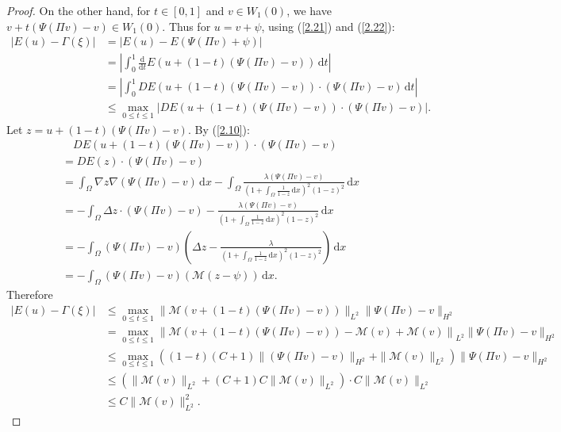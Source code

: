 \documentclass{article}
\numberwithin{equation}{section}
\begin{document}
\begin{proof}
    On the other hand, for $t\in [0,1]$ and $v\in W_1(0)$, we have $v+t(\Psi(\Pi v)-v)\in W_1(0)$. Thus for $u=v+\psi$, using (\ref{2.21}) and (\ref{2.22}):
    \begin{align*}
        |E(u)-\Gamma(\xi)|&=|E(u)-E(\Psi(\Pi v)+\psi)|\\
            &=\left|\int_{0}^{1}\frac{\mathrm{d}}{\mathrm{d}t}E(u+(1-t)(\Psi(\Pi v)-v))\,\mathrm{d}t\right|\\
            &=\left|\int_{0}^{1}DE(u+(1-t)(\Psi(\Pi v)-v))\cdot (\Psi(\Pi v)-v)\,\mathrm{d}t\right|\\
            &\le \max_{0\le t\le1}\left|DE(u+(1-t)(\Psi(\Pi v)-v))\cdot (\Psi(\Pi v)-v)\right|.
    \end{align*}
    Let $z=u+(1-t)(\Psi(\Pi v)-v)$. By (\ref{2.10}):
    \begin{align*}
        &\quad DE(u+(1-t)(\Psi(\Pi v)-v))\cdot (\Psi(\Pi v)-v)\\
        &=DE(z)\cdot (\Psi(\Pi v)-v)\\
            &=\int_{\Omega}\nabla z\nabla (\Psi(\Pi v)-v)\,\mathrm{d}x-\int_{\Omega}\frac{\lambda (\Psi(\Pi v)-v)}{(1+\int_{\Omega}\frac{1}{1-z}\,\mathrm{d}x)^2(1-z)^2}\,\mathrm{d}x\\
            &=-\int_{\Omega}\Delta z\cdot (\Psi(\Pi v)-v)-\frac{\lambda (\Psi(\Pi v)-v)}{(1+\int_{\Omega}\frac{1}{1-z}\,\mathrm{d}x)^2(1-z)^2}\,\mathrm{d}x\\
            &=-\int_{\Omega}(\Psi(\Pi v)-v)\left(\Delta z-\frac{\lambda}{(1+\int_{\Omega}\frac{1}{1-z}\,\mathrm{d}x)^2(1-z)^2}\right)\,\mathrm{d}x\\
            &=-\int_{\Omega}(\Psi(\Pi v)-v)(\mathcal{M}(z-\psi))\,\mathrm{d}x.
    \end{align*}
    Therefore
    \begin{equation}
        \begin{aligned}
            |E(u)-\Gamma(\xi)|&\le \max_{0\le t\le1}\|\mathcal{M}(v+(1-t)(\Psi(\Pi v)-v))\|_{L^{2}}\|\Psi(\Pi v)-v\|_{H^{2}}\\
            &= \max_{0\le t\le1}\left\|\mathcal{M}(v+(1-t)(\Psi(\Pi v)-v))-\mathcal{M}(v)+\mathcal{M}(v)\right\|_{L^{2}}\|\Psi(\Pi v)-v\|_{H^{2}}\\
            &\le \max_{0\le t\le1}\left((1-t)(C+1)\|(\Psi(\Pi v)-v)\|_{H^{2}}+\|\mathcal{M}(v)\|_{L^{2}}\right)\|\Psi(\Pi v)-v\|_{H^{2}}\\
            &\le \left(\|\mathcal{M}(v)\|_{L^{2}}+(C+1)C\|\mathcal{M}(v)\|_{L^{2}}\right)\cdot C\|\mathcal{M}(v)\|_{L^{2}}\\
            &\le C\|\mathcal{M}(v)\|_{L^{2}}^2.
        \end{aligned}\label{2.24}
    \end{equation}


\end{proof}
\end{document}
